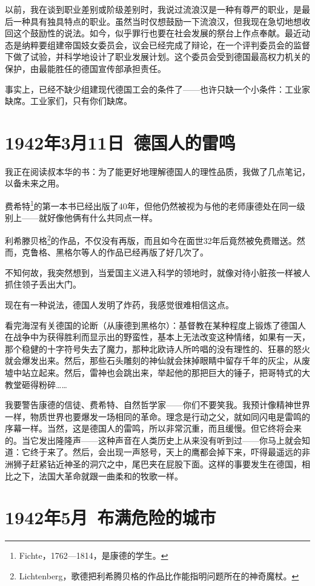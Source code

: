 \documentclass[UTF8]{ctexart}
\begin{document}
以前，我在谈到职业差别或阶级差别时，我说过流浪汉是一种有尊严的职业，是最后一种具有独具特点的职业。虽然当时仅想鼓励一下流浪汉，但我现在急切地想收回这个鼓励性的说法。如今，似乎罪行也要在社会发展的祭台上作点奉献。最近动态是纳粹要组建帝国妓女委员会，议会已经完成了辩论，在一个评判委员会的监督下做了试验，并科学地设计了职业发展计划。这个委员会受到德国最高权力机关的保护，由最能胜任的德国宣传部承担责任。

事实上，已经不缺少组建现代德国工会的条件了——也许只缺一个小条件：工业家缺席。工业家们，只有你们缺席。

\section{1942年3月11日\ 德国人的雷鸣}

我正在阅读叔本华的书：为了能更好地理解德国人的理性品质，我做了几点笔记，以备未来之用。

费希特\footnote{Fichte，1762—1814，是康德的学生。}的第一本书已经出版了40年，但他仍然被视为与他的老师康德处在同一级别上——就好像他俩有什么共同点一样。

利希滕贝格\footnote{Lichtenberg，歌德把利希腾贝格的作品比作能指明问题所在的神奇魔杖。}的作品，不仅没有再版，而且如今在面世32年后竟然被免费赠送。然而，克鲁格、黑格尔等人的作品已经再版了好几次了。

不知何故，我突然想到，当爱国主义进入科学的领地时，就像对待小脏孩一样被人抓住领子丢出大门。

现在有一种说法，德国人发明了炸药，我感觉很难相信这点。

看完海涅有关德国的论断（从康德到黑格尔）：基督教在某种程度上锻炼了德国人在战争中为获得胜利而显示出的野蛮性，基本上无法改变这种情绪，如果有一天，那个稳健的十字符号失去了魔力，那种北欧诗人所吟唱的没有理性的、狂暴的怒火就会爆发出来。然后，那些石头雕刻的神仙就会抹掉眼睛中留存千年的灰尘，从废墟中站立起来。然后，雷神也会跳出来，举起他的那把巨大的锤子，把哥特式的大教堂砸得粉碎……

我要警告康德的信徒、费希特、自然哲学家——你们不要笑我。我预计像精神世界一样，物质世界也要爆发一场相同的革命。理念是行动之父，就如同闪电是雷鸣的序幕一样。当然，这是德国人的雷鸣，所以非常沉重，而且缓慢。但它终将会来的。当它发出隆隆声——这种声音在人类历史上从来没有听到过——你马上就会知道：它终于来了。然后，会出现一声怒号，天上的鹰都会掉下来，吓得最遥远的非洲狮子赶紧钻近神圣的洞穴之中，尾巴夹在屁股下面。这样的事要发生在德国，相比之下，法国大革命就跟一曲柔和的牧歌一样。

\section{1942年5月\ 布满危险的城市}
\end{document}
